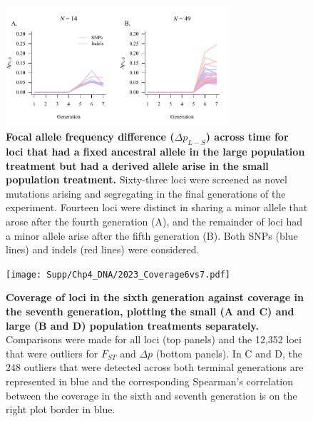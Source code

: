 \begin{figure}[!h]
    \centering
    \includegraphics[width=0.75\textwidth]{Supp/Chp4_DNA/TwoInvariants.pdf}
    \vspace{-0.4cm}
\caption[Focal allele frequency difference ($\Delta p_{L-S}$) across time for loci that had a fixed ancestral allele in the large population treatment but had a derived allele arise in the small population treatment.]{\textbf{Focal allele frequency difference ($\Delta p_{L-S}$) across time for loci that had a fixed ancestral allele in the large population treatment but had a derived allele arise in the small population treatment.} Sixty-three loci were screened as novel mutations arising and segregating in the final generations of the experiment. Fourteen loci were distinct in sharing a minor allele that arose after the fourth generation (A), and the remainder of loci had a minor allele arise after the fifth generation (B). Both SNPs (blue lines) and indels (red lines) were considered.}
    \label{fig:DNAsuppInvaraint}
\end{figure}


\FloatBarrier
\begin{figure}[!htb]
    \centering
    \texttt{[image: Supp/Chp4\_DNA/2023\_Coverage6vs7.pdf]}
\caption[Coverage of loci in the sixth generation against coverage in the seventh generation, plotting the small (A and C) and large (B and D) population treatments separately. ]{\textbf{Coverage of loci in the sixth generation against coverage in the seventh generation, plotting the small (A and C) and large (B and D) population treatments separately.} Comparisons were made for all loci (top panels) and the 12,352 loci that were outliers for $F_{ST}$ and $\Delta p$ (bottom panels). In C and D, the 248 outliers that were detected across both terminal generations are represented in blue and the corresponding Spearman’s correlation between the coverage in the sixth and seventh generation is on the right plot border in blue.  }
    \label{fig:DNAsuppDepthHist}
\end{figure}

